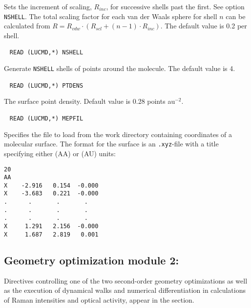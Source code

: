 \begin{description}
Sets the increment of scaling, $R_{inc}$, for successive shells past the first. See option \verb|NSHELL|. The total scaling factor for each van der Waals sphere for shell $n$ can be calculated from $R = R_{vdw}\cdot (R_{scl}+(n-1)\cdot R_{inc})$. The default value is 0.2 \angstrom{} per shell.

\item[\Key{NSHELL}]\verb| |\newline
\verb|READ (LUCMD,*) NSHELL|

Generate \verb|NSHELL| shells of points around the molecule. The default value is 4.

\item[\Key{PTDENS}]\verb| |\newline
\verb|READ (LUCMD,*) PTDENS|

The surface point density. Default value is 0.28 points au$^{-2}$.

\item[\Key{MEPFIL}]\verb| |\newline
\verb|READ (LUCMD,*) MEPFIL|

Specifies the file to load from the work directory containing coordinates of a molecular surface.
The format for the surface is an \verb|.xyz|-file with a title specifying either \angstrom{} (AA) or \bohr{} (AU) units:
\begin{verbatim}
20
AA
X    -2.916   0.154  -0.000
X    -3.683   0.221  -0.000
.      .       .       .
.      .       .       .
.      .       .       .
X     1.291   2.156  -0.000
X     1.687   2.819   0.001
\end{verbatim}

\end{description}


\subsection{Geometry optimization module 2: }
\label{sec:abawalk}

Directives controlling one of the two second-order
geometry
optimizations  as well as the
execution of dynamical walks and numerical
differentiation in
calculations of Raman intensities and optical activity,
appear in the  section.

